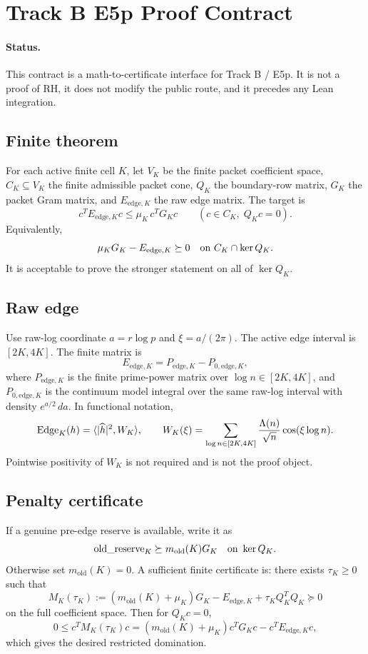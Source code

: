 \section{Track B E5p Proof Contract}

\paragraph{Status.}
This contract is a math-to-certificate interface for Track B / E5p.  It is not
a proof of RH, it does not modify the public route, and it precedes any Lean
integration.

\subsection{Finite theorem}

For each active finite cell \(K\), let \(V_K\) be the finite packet coefficient
space, \(C_K\subseteq V_K\) the finite admissible packet cone, \(Q_K\) the
boundary-row matrix, \(G_K\) the packet Gram matrix, and \(E_{\mathrm{edge},K}\)
the raw edge matrix.  The target is
\[
  c^T E_{\mathrm{edge},K} c
  \le \mu_K\, c^T G_K c
  \qquad(c\in C_K,\; Q_Kc=0).
\]
Equivalently,
\[
  \mu_KG_K-E_{\mathrm{edge},K}\succeq0
  \quad\hbox{on }C_K\cap\ker Q_K.
\]
It is acceptable to prove the stronger statement on all of \(\ker Q_K\).

\subsection{Raw edge}

Use raw-log coordinate \(a=r\log p\) and \(\xi=a/(2\pi)\).  The active edge
interval is \([2K,4K]\).  The finite matrix is
\[
  E_{\mathrm{edge},K}=P_{\mathrm{edge},K}-P_{0,\mathrm{edge},K},
\]
where \(P_{\mathrm{edge},K}\) is the finite prime-power matrix over
\(\log n\in[2K,4K]\), and \(P_{0,\mathrm{edge},K}\) is the continuum model
integral over the same raw-log interval with density \(e^{a/2}\,da\).
In functional notation,
\[
  \mathrm{Edge}_K(h)=\langle |\widehat h|^2,W_K\rangle,\qquad
  W_K(\xi)=\sum_{\log n\in[2K,4K]}
    {\Lambda(n)\over\sqrt n}\cos(\xi\log n).
\]
Pointwise positivity of \(W_K\) is not required and is not the proof object.

\subsection{Penalty certificate}

If a genuine pre-edge reserve is available, write it as
\[
  \mathrm{old\_reserve}_K\succeq m_{\mathrm{old}}(K)G_K
  \quad\hbox{on }\ker Q_K.
\]
Otherwise set \(m_{\mathrm{old}}(K)=0\).  A sufficient finite certificate is:
there exists \(\tau_K\ge0\) such that
\[
  M_K(\tau_K):=(m_{\mathrm{old}}(K)+\mu_K)G_K
    -E_{\mathrm{edge},K}+\tau_K Q_K^TQ_K
  \succeq0
\]
on the full coefficient space.  Then for \(Q_Kc=0\),
\[
  0\le c^TM_K(\tau_K)c
   =(m_{\mathrm{old}}(K)+\mu_K)c^TG_Kc-c^TE_{\mathrm{edge},K}c,
\]
which gives the desired restricted domination.


